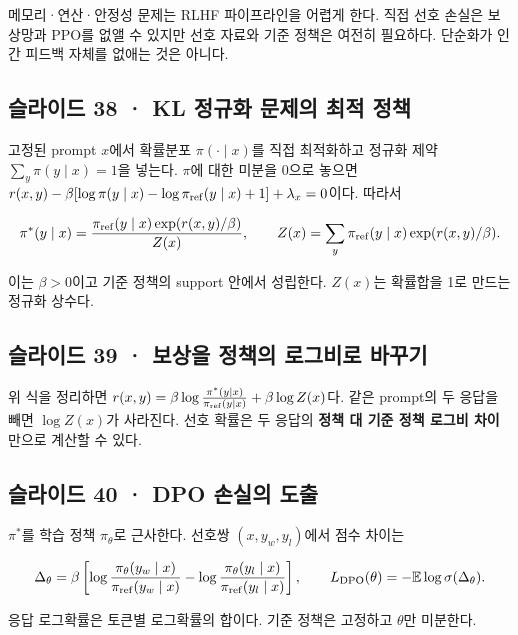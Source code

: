 \documentclass[11pt,a4paper]{article}
\begin{document}
메모리·연산·안정성 문제는 RLHF 파이프라인을 어렵게 한다. 직접 선호 손실은 보상망과 PPO를 없앨 수 있지만 선호 자료와 기준 정책은 여전히 필요하다. 단순화가 인간 피드백 자체를 없애는 것은 아니다.\par

\subsection{슬라이드 38 · KL 정규화 문제의 최적 정책}

고정된 prompt $x$에서 확률분포 $\pi(\cdot\mid x)$를 직접 최적화하고 정규화 제약 $\sum_y\pi(y\mid x)=1$을 넣는다. $\pi$에 대한 미분을 0으로 놓으면 $r(x,y)-\beta[\log\pi(y\mid x)-\log\pi_{\rm ref}(y\mid x)+1]+\lambda_x=0$이다. 따라서\par

\[
\pi^*(y\mid x)=\frac{\pi_{\rm ref}(y\mid x)\exp(r(x,y)/\beta)}{Z(x)},
\qquad Z(x)=\sum_y\pi_{\rm ref}(y\mid x)\exp(r(x,y)/\beta).
\]

이는 $\beta>0$이고 기준 정책의 support 안에서 성립한다. $Z(x)$는 확률합을 1로 만드는 정규화 상수다.\par

\subsection{슬라이드 39 · 보상을 정책의 로그비로 바꾸기}

위 식을 정리하면 $r(x,y)=\beta\log\frac{\pi^*(y\mid x)}{\pi_{\rm ref}(y\mid x)}+\beta\log Z(x)$다. 같은 prompt의 두 응답을 빼면 $\log Z(x)$가 사라진다. 선호 확률은 두 응답의 \textbf{정책 대 기준 정책 로그비 차이}만으로 계산할 수 있다.\par

\subsection{슬라이드 40 · DPO 손실의 도출}

$\pi^*$를 학습 정책 $\pi_\theta$로 근사한다. 선호쌍 $(x,y_w,y_l)$에서 점수 차이는\par

\[
\Delta_\theta=\beta\left[
\log\frac{\pi_\theta(y_w\mid x)}{\pi_{\rm ref}(y_w\mid x)}-
\log\frac{\pi_\theta(y_l\mid x)}{\pi_{\rm ref}(y_l\mid x)}\right],
\qquad L_{\rm DPO}(\theta)=-\mathbb E\log\sigma(\Delta_\theta).
\]

응답 로그확률은 토큰별 로그확률의 합이다. 기준 정책은 고정하고 $\theta$만 미분한다.\par
\end{document}
